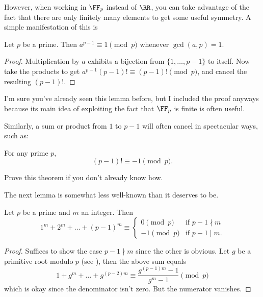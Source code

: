 \documentclass[11pt]{scrartcl}
\begin{document}
However, when working in $\FF_p$ instead of $\RR$, you can take advantage
of the fact that there are only finitely many elements to get some useful symmetry.
A simple manifestation of this is
\begin{lemma}
  Let $p$ be a prime. Then $a^{p-1} \equiv 1 \pmod p$ whenever $\gcd(a,p) = 1$.
\end{lemma}
\begin{proof}
  Multiplication by $a$ exhibits a bijection
  from $\{1, \dots, p-1\}$ to itself.
  Now take the products to get $a^{p-1} (p-1)! \equiv (p-1)! \pmod p$,
  and cancel the resulting $(p-1)!$.
\end{proof}
I'm sure you've already seen this lemma before,
but I included the proof anyways because its main idea of
exploiting the fact that $\FF_p$ is finite is often useful.

Similarly, a sum or product from $1$ to $p-1$ will often cancel in spectacular ways, such as:
\begin{lemma}
  For any prime $p$,
  \[ (p-1)! \equiv -1 \pmod p. \]
\end{lemma}
\begin{exercise}
  Prove this theorem if you don't already know how.
\end{exercise}

The next lemma is somewhat less well-known than it deserves to be.
\begin{lemma}
  \label{lem:powersum_modp}
  Let $p$ be a prime and $m$ an integer.
  Then
  \[ 1^m + 2^m + \dots + (p-1)^m \equiv
    \begin{cases}
      0 \pmod p & \text{if } p-1 \nmid m \\
      -1 \pmod p & \text{if } p-1 \mid m.
    \end{cases} \]
\end{lemma}
\begin{proof}
  Suffices to show the case $p-1 \nmid m$ since the other is obvious.
  Let $g$ be a primitive root modulo $p$ (see \cite{ref:ORPR}),
  then the above sum equals
  \[ 1 + g^m + \dots + g^{(p-2)m}
    \equiv \frac{g^{(p-1)m} - 1}{g^m-1} \pmod p \]
  which is okay since the denominator isn't zero.
  But the numerator vanishes.
\end{proof}
\end{document}

